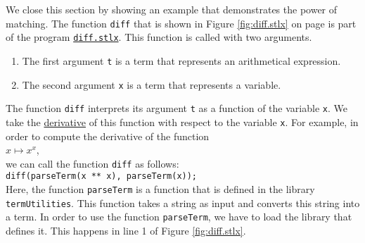 \noindent
We close this section by showing an example that demonstrates the power of matching.
The function \texttt{diff} that is shown in Figure \ref{fig:diff.stlx} on page \pageref{fig:diff.stlx} is part
of the program
\href{https://github.com/karlstroetmann/Logik/blob/master/SetlX/diff.stlx}{\texttt{diff.stlx}}.
This function is called with two arguments.
\begin{enumerate}
\item The first argument \texttt{t} is a term that represents an arithmetical expression.
\item The second argument \texttt{x} is a term that represents a variable.
\end{enumerate}
The function \texttt{diff} interprets its argument \texttt{t} as a function of the variable
\texttt{x}.  We take the \href{https://en.wikipedia.org/wiki/Derivative}{derivative} of this
function with respect to the variable \texttt{x}.  For example, in order to compute the derivative of
the function
\\[0.2cm]
\hspace*{1.3cm}
$x \mapsto x^x$,
\\[0.2cm]
we can call the function  \texttt{diff} as follows:
\\[0.2cm]
\hspace*{1.3cm}
\texttt{diff(parseTerm(x ** x), parseTerm(x));}
\\[0.2cm]
Here, the function \texttt{parseTerm} is a function that is defined in the library \texttt{termUtilities}.
This function takes a string as input and converts this string into a term.  In order to use the function
\texttt{parseTerm}, we have to load the library that defines it.  This happens in line 1 of Figure
\ref{fig:diff.stlx}. 

